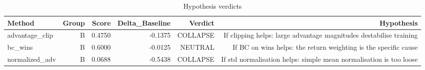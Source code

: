 \begin{table}[htbp]
\centering
\caption{Hypothesis verdicts}
\label{tab:hyp-verdicts}
\begin{tabular}{lrrrrr}
\toprule
\textbf{Method} & \textbf{Group} & \textbf{Score} & \textbf{Delta\_Baseline} & \textbf{Verdict} & \textbf{Hypothesis} \\
\midrule
advantage\_clip & B & 0.4750 & -0.1375 & COLLAPSE & If clipping helps: large advantage magnitudes destabilise training \\
bc\_wins & B & 0.6000 & -0.0125 & NEUTRAL & If BC on wins helps: the return weighting is the specific cause \\
normalized\_adv & B & 0.0688 & -0.5438 & COLLAPSE & If std normalisation helps: simple mean normalisation is too loose \\
\bottomrule
\end{tabular}
\end{table}